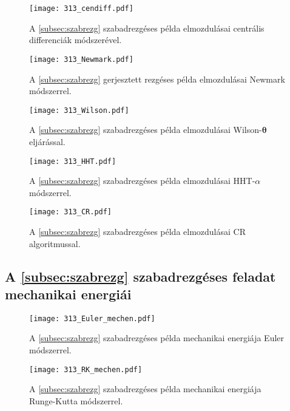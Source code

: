 \begin{figure}[H]
\centering
\texttt{[image: 313\_cendiff.pdf]}
\caption{A \ref{subsec:szabrezg} szabadrezgéses példa elmozdulásai centrális differenciák módszerével.}
\label{fig:függszabrezg_er_centdiff}
\end{figure}

\begin{figure}[H]
\centering
\texttt{[image: 313\_Newmark.pdf]}
\caption{A \ref{subsec:szabrezg} gerjesztett rezgéses példa elmozdulásai Newmark módszerrel.}
\label{fig:függszabrezg_er_newmark}
\end{figure}

\begin{figure}[H]
\centering
\texttt{[image: 313\_Wilson.pdf]}
\caption{A \ref{subsec:szabrezg} szabadrezgéses példa elmozdulásai Wilson-$\boldsymbol\theta$ eljárással.}
\label{fig:függszabrezg_er_wilson}
\end{figure}

\begin{figure}[H]
\centering
\texttt{[image: 313\_HHT.pdf]}
\caption{A \ref{subsec:szabrezg} szabadrezgéses példa elmozdulásai HHT-$\alpha$ módszerrel.}
\label{fig:függszabrezg_er_hht}
\end{figure}

\begin{figure}[H]
\centering
\texttt{[image: 313\_CR.pdf]}
\caption{A \ref{subsec:szabrezg} szabadrezgéses példa elmozdulásai CR algoritmussal.}
\label{fig:függszabrezg_er_cr}
\end{figure}

\subsection{A \ref{subsec:szabrezg} szabadrezgéses feladat mechanikai energiái}\label{sec:függ_szabrezg_mechen}

\begin{figure}[H]
\centering
\texttt{[image: 313\_Euler\_mechen.pdf]}
\caption{A \ref{subsec:szabrezg} szabadrezgéses példa mechanikai energiája Euler módszerrel.}
\end{figure}

\begin{figure}[H]
\centering
\texttt{[image: 313\_RK\_mechen.pdf]}
\caption{A \ref{subsec:szabrezg} szabadrezgéses példa mechanikai energiája Runge-Kutta módszerrel.}
\end{figure}

